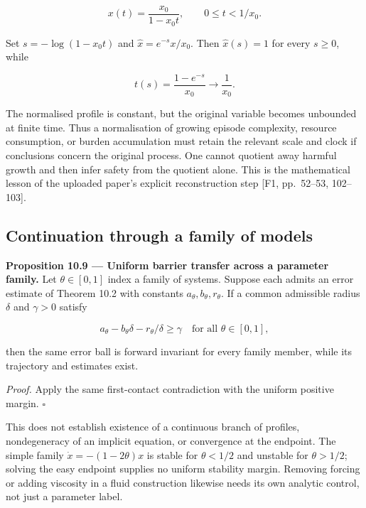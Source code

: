 \documentclass[11pt,a4paper]{article}
\begin{document}
\nopagebreak[4]

\[x(t)=\frac{x_0}{1-x_0t},\qquad 0\leq t<1/x_0.\]

Set \(s=-\log(1-x_0t)\) and \(\widehat x=e^{-s}x/x_0\). Then
\(\widehat x(s)=1\) for every \(s\geq0\), while

\nopagebreak[4]

\[t(s)=\frac{1-e^{-s}}{x_0}\longrightarrow\frac1{x_0}.\]

The normalised profile is constant, but the original variable becomes
unbounded at finite time. Thus a normalisation of growing episode
complexity, resource consumption, or burden accumulation must retain the
relevant scale and clock if conclusions concern the original process.
One cannot quotient away harmful growth and then infer safety from the
quotient alone. This is the mathematical lesson of the uploaded paper's
explicit reconstruction step {[}F1, pp.~52--53, 102--103{]}.

\subsection{Continuation through a family of
models}\label{continuation-through-a-family-of-models}


\textbf{Proposition 10.9 --- Uniform barrier transfer across a parameter
family.} Let \(\theta\in[0,1]\) index a family of systems. Suppose each
admits an error estimate of Theorem 10.2 with constants
\(a_\theta,b_\theta,r_\theta\). If a common admissible radius \(\delta\)
and \(\gamma>0\) satisfy

\nopagebreak[4]

\[a_\theta-b_\theta\delta-r_\theta/\delta\geq\gamma
\quad\text{for all }\theta\in[0,1],\]

then the same error ball is forward invariant for every family member,
while its trajectory and estimates exist.

\emph{Proof.} Apply the same first-contact contradiction with the
uniform positive margin. \(\square\)

This does not establish existence of a continuous branch of profiles,
nondegeneracy of an implicit equation, or convergence at the endpoint.
The simple family \(\dot x=-(1-2\theta)x\) is stable for \(\theta<1/2\)
and unstable for \(\theta>1/2\); solving the easy endpoint supplies no
uniform stability margin. Removing forcing or adding viscosity in a
fluid construction likewise needs its own analytic control, not just a
parameter label.
\end{document}

